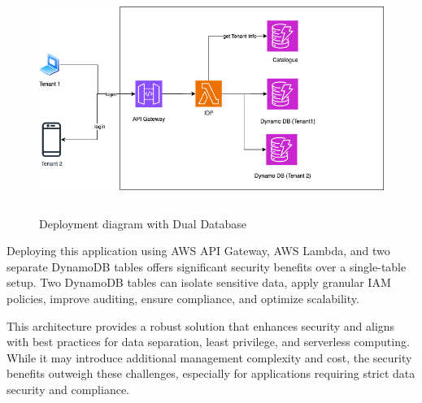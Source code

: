 \begin{figure}[h!]
\centering
\caption{Deployment diagram with Dual Database}\label{fig:deployment_diagram_dual}
\includegraphics[width=\textwidth, height=280px]{pics/deployment_diagram.dual.png}
\end{figure}


Deploying this application using AWS API Gateway, AWS Lambda, and two separate DynamoDB tables offers significant security benefits over a single-table setup. Two DynamoDB tables can isolate sensitive data, apply granular IAM policies, improve auditing, ensure compliance, and optimize scalability.

This architecture provides a robust solution that enhances security and aligns with best practices for data separation, least privilege, and serverless computing. While it may introduce additional management complexity and cost, the security benefits outweigh these challenges, especially for applications requiring strict data security and compliance.